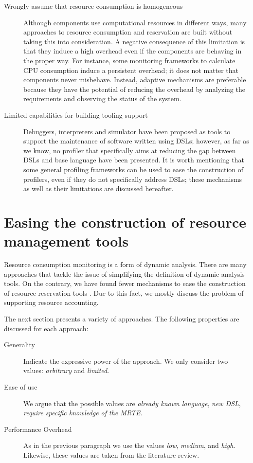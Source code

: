 \begin{description}
\item[Wrongly assume that resource consumption is homogeneous]
Although components use computational resources in different ways, many approaches to resource consumption and reservation are built without taking this into consideration.
A negative consequence of this limitation is that they induce a high overhead even if the components are behaving in the proper way.
For instance, some monitoring frameworks to calculate CPU consumption induce a persistent overhead; it does not matter that components never misbehave.
Instead, adaptive mechanisms are preferable because they have the potential of reducing the overhead by analyzing the requirements and observing the status of the system.

\item[Limited capabilities for building tooling support] Debuggers, interpreters and simulator have been proposed as tools to support the maintenance of software written using DSLs; however, as far as we know, no profiler that specifically aims at reducing the gap between DSLs and base language have been presented.
It is worth mentioning that some general profiling frameworks can be used to ease the construction of profilers, even if they do not specifically address DSLs; these mechanisms as well as their limitations are discussed hereafter.

\end{description}



\section{Easing the construction of resource management tools} \label{sec:easy-tools-contruction}

Resource consumption monitoring is a form of dynamic analysis.
There are many approaches that tackle the issue of simplifying the definition of dynamic analysis tools.
On the contrary, we have found fewer mechanisms to ease the construction of resource reservation tools \cite{mueller}.
Due to this fact, we mostly discuss the problem of supporting resource accounting. 

The next section presents a variety of approaches. The following properties are discussed for each approach:

\begin{description}
\item[Generality] Indicate the expressive power of the approach. We only consider two values: \textit{arbitrary} and \textit{limited}.

\item[Ease of use] We argue that the possible values are \textit{already known language}, \textit{new DSL}, \textit{require specific knowledge of the MRTE}.

\item[Performance Overhead] As in the previous paragraph we use the values \textit{low}, \textit{medium}, and \textit{high}.
Likewise, these values are taken from the literature review.
\end{description}

